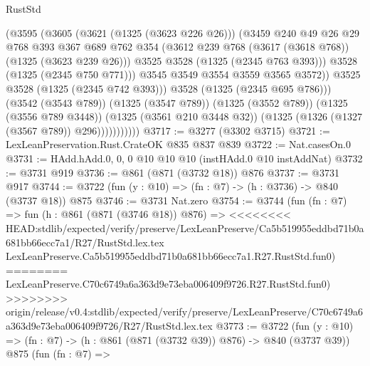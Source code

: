 \begin{lexlean}{RustStd}
\begin{coremodule}
{\begin{coremodule}
{{{{{{{{{                            (@3595
                              (@3605
                                (@3621 (@1325 (@3623 @226 @26)))
                                (@3459
                                  @240
                                  @49
                                  @26
                                  @29
                                  @768
                                  @393
                                  @367
                                  @689
                                  @762
                                  @354
                                  (@3612 @239 @768 (@3617 (@3618 @768)) (@1325 (@3623 @239 @26)))
                                  @3525
                                  @3528
                                  (@1325 (@2345 @763 @393)))
                                @3528
                                (@1325 (@2345 @750 @771)))
                              @3545
                              @3549
                              @3554
                              @3559
                              @3565
                              @3572))
                          @3525
                          @3528
                          (@1325 (@2345 @742 @393)))
                        @3528
                        (@1325 (@2345 @695 @786)))
                      (@3542 (@3543 @789))
                      (@1325 (@3547 @789))
                      (@1325 (@3552 @789))
                      (@1325 (@3556 @789 @3448))
                      (@1325 (@3561 @210 @3448 @32))
                      (@1325 (@1326 (@1327 (@3567 @789)) @296)))))))))))
@3717 := @3277 (@3302 @3715)
@3721 := LexLeanPreservation.Rust.CrateOK @835 @837 @839
@3722 := Nat.casesOn.{0}
@3731 := HAdd.hAdd.{0, 0, 0} @10 @10 @10 (instHAdd.{0} @10 instAddNat)
@3732 := @3731 @919
@3736 := @861 (@871 (@3732 @18)) @876
@3737 := @3731 @917
@3744 := @3722 (fun (y : @10) => (fn : @7) -> (h : @3736) -> @840 (@3737 @18)) @875
@3746 := @3731 Nat.zero
@3754 := @3744
    (fun (fn : @7) =>
    fun (h : @861 (@871 (@3746 @18)) @876) =>
<<<<<<<< HEAD:stdlib/expected/verify/preserve/LexLeanPreserve/Ca5b519955eddbd71b0a681bb66ecc7a1/R27/RustStd.lex.tex
    LexLeanPreserve.Ca5b519955eddbd71b0a681bb66ecc7a1.R27.RustStd.fun0)
========
    LexLeanPreserve.C70c6749a6a363d9e73eba006409f9726.R27.RustStd.fun0)
>>>>>>>> origin/release/v0.4:stdlib/expected/verify/preserve/LexLeanPreserve/C70c6749a6a363d9e73eba006409f9726/R27/RustStd.lex.tex
@3773 := @3722
    (fun (y : @10) => (fn : @7) -> (h : @861 (@871 (@3732 @39)) @876) -> @840 (@3737 @39))
    @875
    (fun (fn : @7) =>
}}}}}}}}}
\end{coremodule}}
\end{coremodule}
\end{lexlean}
